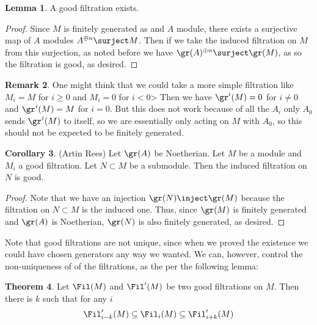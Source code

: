 \documentclass[12 pt]{article}
\theoremstyle{definition}
\newtheorem{thm}{Theorem}[section]
\newtheorem{cor}[thm]{Corollary}
\newtheorem{lemma}[thm]{Lemma}
\newtheorem{rmk}[thm]{Remark}
\renewcommand{\(}{\left(}
\renewcommand{\)}{\right)}
\begin{document}
\begin{lemma} A good filtration exists.
\end{lemma}

\begin{proof} Since $M$ is finitely generated as and $A$ module, there exists a surjective map of $A$ modules $A^{\oplus n} \surject M$. Then if we take the induced filtration on $M$ from this surjection, as noted before we have $\gr(A)^{\oplus n} \surject \gr(M)$, as so the filtration is good, as desired.
\end{proof}

\begin{rmk} One might think that we could take a more simple filtration like $M_i=M$ for $i \geq 0$ and $M_i=0$ for $i<0$> Then we have $\gr^i(M)=0$ for $i \neq 0$ and $\gr^i(M)=M$ for $i=0$. But this does not work because of all the $A_i$ only $A_0$ sends $\gr^i(M)$ to itself, so we are essentially only acting on $M$ with $A_0$, so this should not be expected to be finitely generated.
\end{rmk}




\begin{cor} (Artin Rees) Let $\gr(A)$ be Noetherian. Let $M$ be a module and $M_i$ a good filtration. Let $N \subset M$ be a submodule. Then the induced filtration on $N$ is good.
\label{artinrees1}
\end{cor}
\begin{proof} Note that we have an injection $\gr(N) \inject \gr(M)$ because the filtration on $N \subset M$ is the induced one. Thus, since $\gr(M)$ is finitely generated and $\gr(A)$ is Noetherian, $\gr(N)$ is also finitely generated, as desired.
\end{proof}


Note that good filtrations are not unique, since when we proved the existence we could have chosen generators any way we wanted. We can, however, control the non-uniqueness of of the filtrations, as the per the following lemma:

\begin{thm} Let $\Fil(M)$ and $\Fil'(M)$ be two good filtrations on $M$. Then there is $k$ such that for any $i$
\[\Fil_{i-k}'(M) \subseteq \Fil_i(M) \subseteq \Fil_{i+k}'(M)\]
\label{essnunique1}
\end{thm}
\end{document}
